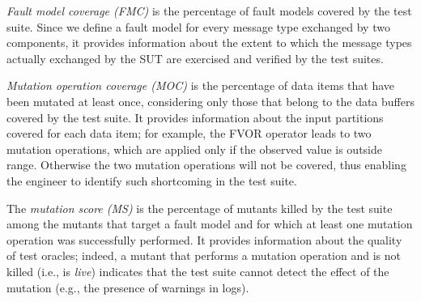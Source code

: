 \emph{Fault model coverage (FMC)} is the percentage of fault models covered by the test suite. Since we define a fault model for every 
message type exchanged by two components,
it provides information about the extent to which the message types actually exchanged by the SUT are exercised and verified by the test suites. 

\emph{Mutation operation coverage (MOC)} is the percentage of data items that have been mutated at least once, considering only those that belong to the data buffers covered by the test suite. It provides information about the input partitions covered for each data item; for example, the FVOR operator leads to two mutation operations, which are applied only if the observed value is outside range. Otherwise the two mutation operations will not be covered, thus enabling the engineer to identify such shortcoming in the test suite.

The \emph{mutation score (MS)} is the percentage of mutants killed by the test suite  among the mutants that target a fault model and for which at least one mutation operation was successfully performed. It provides information about the quality of test oracles; indeed, a mutant that performs a mutation operation and is not killed (i.e., is \emph{live}) indicates that the test suite cannot detect the effect of the mutation (e.g., the presence of warnings in logs).


